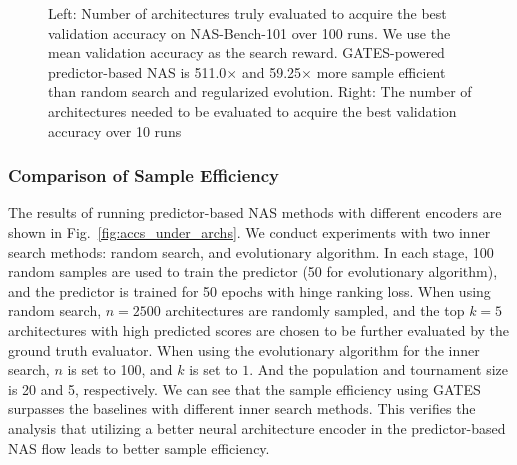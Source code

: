 \documentclass[runningheads]{llncs}
\begin{document}
\begin{figure}[tb]
  \vspace{-5pt}
\caption{Left: Number of architectures truly evaluated to acquire the best validation accuracy on NAS-Bench-101 over 100 runs. We use the mean validation accuracy as the search reward. GATES-powered predictor-based NAS is 511.0$\times$ and 59.25$\times$ more sample efficient than random search and regularized evolution. Right: 
The number of architectures needed to be evaluated to acquire the best validation accuracy over 10 runs}
\label{fig:box_ablation}
\end{figure}


\subsubsection{Comparison of Sample Efficiency}
The results of running predictor-based NAS methods with different encoders are shown in Fig.~\ref{fig:accs_under_archs}. We conduct experiments with two inner search methods: random search, and evolutionary algorithm. 
In each stage, 100 random samples are used to train the predictor (50 for evolutionary algorithm), and the predictor is trained for 50 epochs with hinge ranking loss. When using random search, $n=2500$ architectures are randomly sampled, and the top $k=5$ architectures with high predicted scores are chosen to be further evaluated by the ground truth evaluator. When using the evolutionary algorithm for the inner search, $n$ is set to 100, and $k$ is set to $1$. And the population and tournament size is 20 and 5, respectively. 
We can see that the sample efficiency using GATES surpasses the baselines with different inner search methods. This verifies the analysis that utilizing a better neural architecture encoder in the predictor-based NAS flow leads to better sample efficiency.
\end{document}
